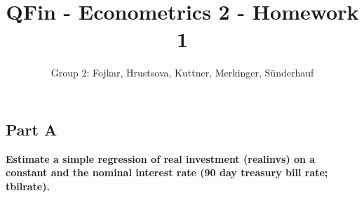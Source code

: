 \documentclass{article}\usepackage[]{graphicx}\usepackage[]{color}
\title{QFin - Econometrics 2 - Homework 1}
\author{Group 2: Fojkar, Hrustsova, Kuttner, Merkinger, Sünderhauf}
\newcommand{\1}{\mathbb{1}}
\begin{document}
\setlength\parindent{0pt}
\maketitle



\subsection*{Part A}
\textbf{Estimate a simple regression of real investment (realinvs) on a constant and the nominal interest rate (90 day treasury bill rate; tbilrate).}
\end{document}
